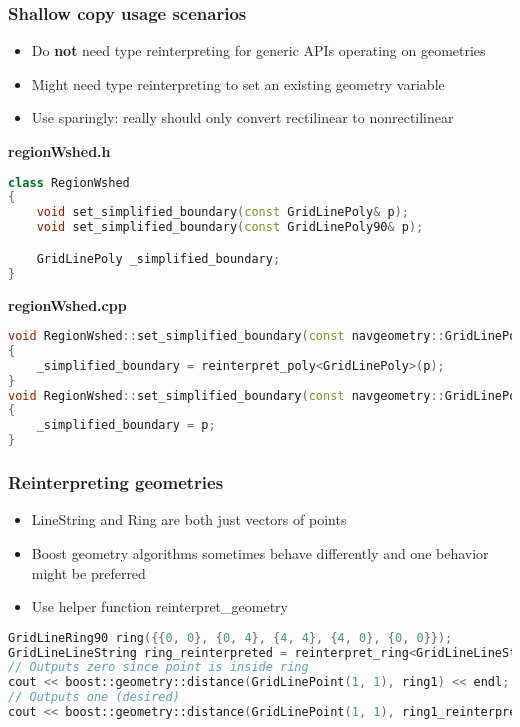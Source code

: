 \documentclass{beamer}
\begin{document}
\begin{frame}[fragile]
    \frametitle{Shallow copy usage scenarios}
    \begin{itemize}
        \footnotesize
    \item Do \textbf{not} need type reinterpreting for generic APIs operating on geometries
    \item Might need type reinterpreting to set an existing geometry variable
    \item Use sparingly: really should only convert rectilinear to nonrectilinear
\end{itemize}
\textbf{regionWshed.h}
\begin{lstlisting}[language=C++, basicstyle=\tiny]
class RegionWshed
{
    void set_simplified_boundary(const GridLinePoly& p);
    void set_simplified_boundary(const GridLinePoly90& p);

    GridLinePoly _simplified_boundary;
}
\end{lstlisting}
\textbf{regionWshed.cpp}
\begin{lstlisting}[language=C++, basicstyle=\tiny]
void RegionWshed::set_simplified_boundary(const navgeometry::GridLinePoly90& p)
{
    _simplified_boundary = reinterpret_poly<GridLinePoly>(p);
}
void RegionWshed::set_simplified_boundary(const navgeometry::GridLinePoly& p)
{
    _simplified_boundary = p;
}
\end{lstlisting}
\end{frame}

\begin{frame}[fragile]
    \frametitle{Reinterpreting geometries}
    \begin{itemize}
        \item LineString and Ring are both just vectors of points
        \item Boost geometry algorithms sometimes behave differently and one behavior might be preferred
        \item Use helper function reinterpret\_geometry
    \end{itemize}
    \begin{lstlisting}[language=C++, basicstyle=\tiny]
GridLineRing90 ring({{0, 0}, {0, 4}, {4, 4}, {4, 0}, {0, 0}});
GridLineLineString ring_reinterpreted = reinterpret_ring<GridLineLineString>(ring);
// Outputs zero since point is inside ring
cout << boost::geometry::distance(GridLinePoint(1, 1), ring1) << endl;
// Outputs one (desired)
cout << boost::geometry::distance(GridLinePoint(1, 1), ring1_reinterpreted) << endl;
    \end{lstlisting}
\end{frame}
\end{document}
